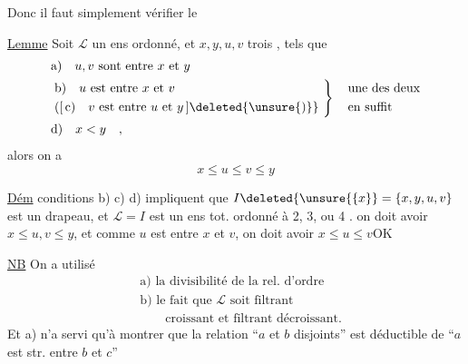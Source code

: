 Donc il faut simplement vérifier le

\uline{Lemme} Soit $\mathcal L$ un ens ordonné, et $x,y,u,v$ trois , tels que
\[
\begin{aligned}
&\text{a)}\quad u,v\text{ sont entre }x\text{ et }y\\
&\left.\begin{aligned}
&\text{b)}\quad u\text{ est entre }x\text{ et }v\\
&([\,\text{c)}\quad v\text{ est entre }u\text{ et }y\,]\deleted{\unsure{)}}
\end{aligned}\ \right\}\quad
\begin{aligned}&\text{une des deux}\\&\text{en suffit}\end{aligned}\\
&\text{d)}\quad x<y\quad,
\end{aligned}
\]
alors on a
\[
x\leq u\leq v\leq y
\]

\uline{Dém}   conditions b) c) d) impliquent que $I\deleted{\unsure{\{x}}=\{x,y,u,v\}$ est un drapeau,  et  $\mathcal L=I$ est un ens tot. ordonné  à 2, 3, ou 4 .
    on doit avoir $x\leq u,v\leq y$,  et comme $u$ est entre $x$ et $v$, on doit avoir $x\leq u\leq v$\quad OK

\uline{NB} On a utilisé
\[
\begin{aligned}
&\text{a) la divisibilité de la rel. d'ordre}\\
&\text{b) le fait que }\mathcal L\text{ soit filtrant}\\
&\hspace{2em}\text{croissant et filtrant décroissant.}
\end{aligned}
\]
Et a) n'a servi qu'à montrer que la relation ``$a$ et $b$ disjoints'' est déductible de ``$a$ est str. entre $b$ et $c$''

